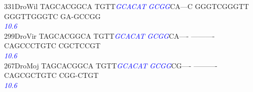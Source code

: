 \documentclass[11pt,twoside,reqno,a4paper]{article}
\begin{document}
{331\hspace*{1\charwidth}DroWil	TAGCACGGCA	TGTT\textit{\textcolor{blue}{G}}\textit{\textcolor{blue}{C}}\textit{\textcolor{blue}{A}}\textit{\textcolor{blue}{C}}\textit{\textcolor{blue}{A}}\textit{\textcolor{blue}{T}}	\textit{\textcolor{blue}{G}}\textit{\textcolor{blue}{C}}\textit{\textcolor{blue}{G}}\textit{\textcolor{blue}{G}}CA---C	GGGTCGGGTT	GGGTTGGGTC	GA-GCCGG\\
\hspace*{4\charwidth}\hspace*{7\charwidth}\hspace*{1\charwidth}\hspace*{14\charwidth}\textit{\textcolor{blue}{10.6}}\hspace*{1\charwidth}\hspace*{1\charwidth}\hspace*{1\charwidth}\hspace*{1\charwidth}\\
299\hspace*{1\charwidth}DroVir	TAGCACGGCA	TGTT\textit{\textcolor{blue}{G}}\textit{\textcolor{blue}{C}}\textit{\textcolor{blue}{A}}\textit{\textcolor{blue}{C}}\textit{\textcolor{blue}{A}}\textit{\textcolor{blue}{T}}	\textit{\textcolor{blue}{G}}\textit{\textcolor{blue}{C}}\textit{\textcolor{blue}{G}}\textit{\textcolor{blue}{G}}CA----	----------	CAGCCCTGTC	CGCTCCGT\\
\hspace*{4\charwidth}\hspace*{7\charwidth}\hspace*{1\charwidth}\hspace*{14\charwidth}\textit{\textcolor{blue}{10.6}}\hspace*{1\charwidth}\hspace*{1\charwidth}\hspace*{1\charwidth}\hspace*{1\charwidth}\\
267\hspace*{1\charwidth}DroMoj	TAGCACGGCA	TGTT\textit{\textcolor{blue}{G}}\textit{\textcolor{blue}{C}}\textit{\textcolor{blue}{A}}\textit{\textcolor{blue}{C}}\textit{\textcolor{blue}{A}}\textit{\textcolor{blue}{T}}	\textit{\textcolor{blue}{G}}\textit{\textcolor{blue}{C}}\textit{\textcolor{blue}{G}}\textit{\textcolor{blue}{G}}CG----	----------	CAGCGCTGTC	CGG-CTGT\\
\hspace*{4\charwidth}\hspace*{7\charwidth}\hspace*{1\charwidth}\hspace*{14\charwidth}\textit{\textcolor{blue}{10.6}}\hspace*{1\charwidth}\hspace*{1\charwidth}\hspace*{1\charwidth}\hspace*{1\charwidth}\\
}
\end{document}
